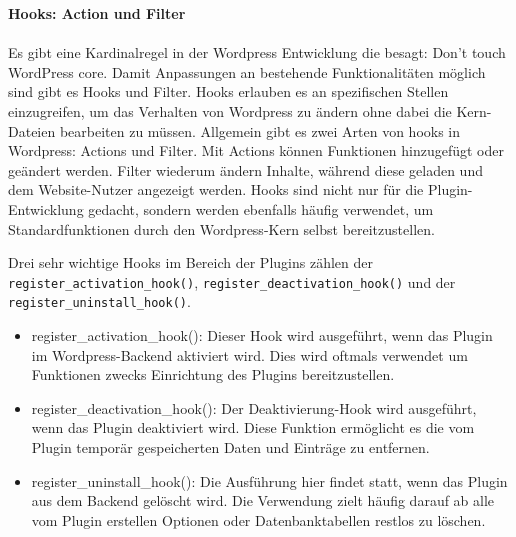\newpage
\textbf{Hooks: Action und Filter}\\\\
Es gibt eine Kardinalregel in der Wordpress Entwicklung die besagt: Don’t touch WordPress core. %
Damit Anpassungen an bestehende Funktionalitäten möglich sind gibt es Hooks und Filter.
Hooks erlauben es an spezifischen Stellen einzugreifen, um das Verhalten von Wordpress zu ändern ohne dabei die Kern-Dateien bearbeiten zu müssen.
Allgemein gibt es zwei Arten von hooks in Wordpress: Actions und Filter.
Mit Actions können Funktionen hinzugefügt oder geändert werden.
Filter wiederum ändern Inhalte, während diese geladen und dem Website-Nutzer angezeigt werden.
Hooks sind nicht nur für die Plugin-Entwicklung gedacht, sondern werden ebenfalls häufig verwendet, um Standardfunktionen durch den Wordpress-Kern selbst bereitzustellen.

Drei sehr wichtige Hooks im Bereich der Plugins zählen der \texttt{register\_activation\_hook()}, \texttt{register\_deactivation\_hook()} und der \texttt{register\_uninstall\_hook()}.

\begin{itemize}
 \item register\_activation\_hook(): Dieser Hook wird ausgeführt, wenn das Plugin im Wordpress-Backend aktiviert wird. Dies wird oftmals verwendet um Funktionen zwecks Einrichtung des Plugins bereitzustellen.
 \item register\_deactivation\_hook(): Der Deaktivierung-Hook wird ausgeführt, wenn das Plugin deaktiviert wird. Diese Funktion ermöglicht es die vom Plugin temporär gespeicherten Daten und Einträge zu entfernen.
 \item register\_uninstall\_hook(): Die Ausführung hier findet statt, wenn das Plugin aus dem Backend gelöscht wird. Die Verwendung zielt häufig darauf ab alle vom Plugin erstellen Optionen oder Datenbanktabellen restlos zu löschen.
\end{itemize}






